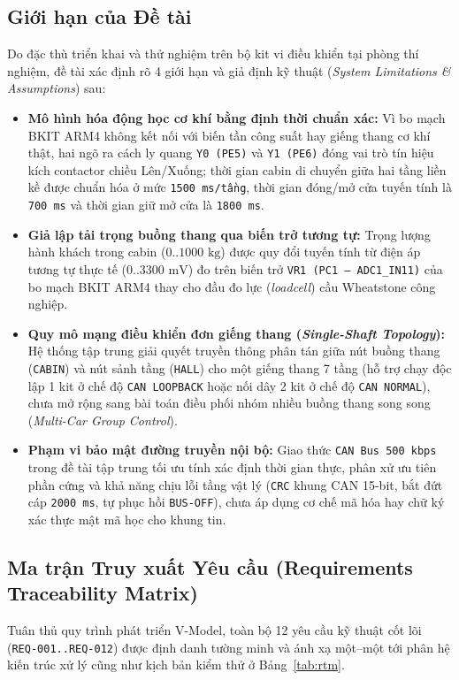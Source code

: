 \subsection{Giới hạn của Đề tài}
Do đặc thù triển khai và thử nghiệm trên bộ kit vi điều khiển tại phòng thí nghiệm, đề tài xác định rõ 4 giới hạn và giả định kỹ thuật (\textit{System Limitations \& Assumptions}) sau:
\begin{itemize}[nosep]
    \item \textbf{Mô hình hóa động học cơ khí bằng định thời chuẩn xác:} Vì bo mạch BKIT ARM4 không kết nối với biến tần công suất hay giếng thang cơ khí thật, hai ngõ ra cách ly quang \texttt{Y0 (PE5)} và \texttt{Y1 (PE6)} đóng vai trò tín hiệu kích contactor chiều Lên/Xuống; thời gian cabin di chuyển giữa hai tầng liền kề được chuẩn hóa ở mức \texttt{1500~ms/tầng}, thời gian đóng/mở cửa tuyến tính là \texttt{700~ms} và thời gian giữ mở cửa là \texttt{1800~ms}.
    \item \textbf{Giả lập tải trọng buồng thang qua biến trở tương tự:} Trọng lượng hành khách trong cabin ($0..1000\text{ kg}$) được quy đổi tuyến tính từ điện áp tương tự thực tế ($0..3300\text{ mV}$) đo trên biến trở \texttt{VR1 (PC1 -- ADC1\_IN11)} của bo mạch BKIT ARM4 thay cho đầu đo lực (\textit{loadcell}) cầu Wheatstone công nghiệp.
    \item \textbf{Quy mô mạng điều khiển đơn giếng thang (\textit{Single-Shaft Topology}):} Hệ thống tập trung giải quyết truyền thông phân tán giữa nút buồng thang (\texttt{CABIN}) và nút sảnh tầng (\texttt{HALL}) cho một giếng thang 7 tầng (hỗ trợ chạy độc lập 1 kit ở chế độ \texttt{CAN LOOPBACK} hoặc nối dây 2 kit ở chế độ \texttt{CAN NORMAL}), chưa mở rộng sang bài toán điều phối nhóm nhiều buồng thang song song (\textit{Multi-Car Group Control}).
    \item \textbf{Phạm vi bảo mật đường truyền nội bộ:} Giao thức \texttt{CAN Bus 500 kbps} trong đề tài tập trung tối ưu tính xác định thời gian thực, phân xử ưu tiên phần cứng và khả năng chịu lỗi tầng vật lý (\texttt{CRC} khung CAN 15-bit, bắt đứt cáp \texttt{2000~ms}, tự phục hồi \texttt{BUS-OFF}), chưa áp dụng cơ chế mã hóa hay chữ ký xác thực mật mã học cho khung tin.
\end{itemize}

\clearpage
\subsection{Ma trận Truy xuất Yêu cầu (Requirements Traceability Matrix)}
Tuân thủ quy trình phát triển V-Model, toàn bộ 12 yêu cầu kỹ thuật cốt lõi (\texttt{REQ-001..REQ-012}) được định danh tường minh và ánh xạ một--một tới phân hệ kiến trúc xử lý cũng như kịch bản kiểm thử ở Bảng~\ref{tab:rtm}.

